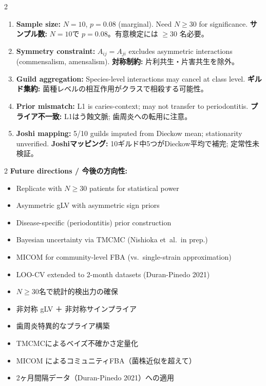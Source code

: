 \documentclass[10pt,a4paper]{article}
\begin{document}
\begin{limitbox}[Limitations / 限界]
\begin{multicols}{2}
\small
\begin{enumerate}[noitemsep,leftmargin=*]
  \item \textbf{Sample size:} $N=10$, $p=0.08$ (marginal). Need $N\geq30$ for significance.
        \textbf{サンプル数:} $N=10$で $p=0.08$。有意検定には $\geq30$ 名必要。
  \item \textbf{Symmetry constraint:} $A_{ij}=A_{ji}$ excludes asymmetric interactions
        (commensalism, amensalism).
        \textbf{対称制約:} 片利共生・片害共生を除外。
  \item \textbf{Guild aggregation:} Species-level interactions may cancel at class level.
        \textbf{ギルド集約:} 菌種レベルの相互作用がクラスで相殺する可能性。
  \item \textbf{Prior mismatch:} L1 is caries-context; may not transfer to periodontitis.
        \textbf{プライア不一致:} L1はう蝕文脈; 歯周炎への転用に注意。
  \item \textbf{Joshi mapping:} 5/10 guilds imputed from Dieckow mean; stationarity unverified.
        \textbf{Joshiマッピング:} 10ギルド中5つがDieckow平均で補完; 定常性未検証。
\end{enumerate}
\end{multicols}
\end{limitbox}

\begin{multicols}{2}
\small
\textbf{Future directions / 今後の方向性:}
\begin{itemize}[noitemsep,leftmargin=*]
  \item Replicate with $N\geq30$ patients for statistical power
  \item Asymmetric gLV with asymmetric sign priors
  \item Disease-specific (periodontitis) prior construction
  \item Bayesian uncertainty via TMCMC (Nishioka et~al.\ in prep.)
  \item MICOM for community-level FBA (vs.\ single-strain approximation)
  \item LOO-CV extended to 2-month datasets (Duran-Pinedo 2021)
\end{itemize}
\columnbreak
\begin{itemize}[noitemsep,leftmargin=*]
  \item $N\geq30$名で統計的検出力の確保
  \item 非対称 gLV ＋ 非対称サインプライア
  \item 歯周炎特異的なプライア構築
  \item TMCMCによるベイズ不確かさ定量化
  \item MICOM によるコミュニティFBA（菌株近似を超えて）
  \item 2ヶ月間隔データ（Duran-Pinedo 2021）への適用
\end{itemize}
\end{multicols}
\end{document}
